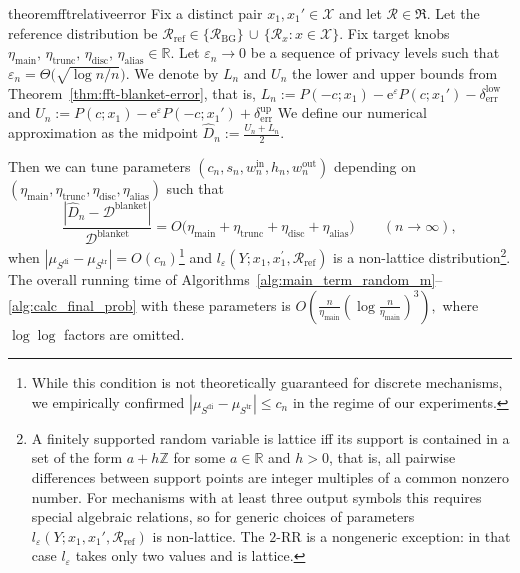\documentclass{article}
\theoremstyle{plain}
\theoremstyle{definition}
\begin{document}
\begin{restatable}{theorem}{fftrelativeerror}
\label{thm:fft-relative-error}
Fix a distinct pair $x_1,x_1' \in \mathcal{X}$ and let $\mathcal R\in\mathfrak{R}$.
Let the reference distribution be
$
  \mathcal R_{\mathrm{ref}}
  \in
  \bigl\{\mathcal R_{\mathrm{BG}}\bigr\}
  \,\cup\,
  \bigl\{\mathcal R_x : x\in\mathcal X\bigr\}.
$
Fix target knobs
$
  \eta_{\mathrm{main}},\,
  \eta_{\mathrm{trunc}},\,
  \eta_{\mathrm{disc}},\,
  \eta_{\mathrm{alias}}
  \in \mathbb{R}.
$
Let $\varepsilon_n\to0$ be a sequence of privacy levels such that
$
  \varepsilon_n= \Theta\bigl(\sqrt{\log n / n}\bigr).
$
We denote by $L_n$ and $U_n$ the lower and upper bounds from
Theorem~\ref{thm:fft-blanket-error}, that is,
$
  L_n
  :=
  P(-c;x_1) - \mathrm e^\varepsilon P(c;x_1')
  - \delta^{\mathrm{low}}_{\mathrm{err}}
$ and
$
  U_n
  :=
  P(c;x_1) - \mathrm e^\varepsilon P(-c;x_1')
  + \delta^{\mathrm{up}}_{\mathrm{err}}
$
We define our numerical approximation as the midpoint
$
  \widehat D_n := \frac{U_n + L_n}{2}.
$

Then we can tune parameters
$
  (c_n,s_n,w_n^{\mathrm{in}},h_n,w_n^{\mathrm{out}})
$
depending on
$(\eta_{\mathrm{main}},\eta_{\mathrm{trunc}},\eta_{\mathrm{disc}},\eta_{\mathrm{alias}})$
such that
\[
  \frac{|\widehat D_n - \mathcal{D}^{\mathrm{blanket}}|}{\mathcal{D}^{\mathrm{blanket}}}
  = O\bigl(
    \eta_{\mathrm{main}}
    + \eta_{\mathrm{trunc}}
    + \eta_{\mathrm{disc}}
    + \eta_{\mathrm{alias}}
  \bigr)
  \qquad (n\to\infty),
\]
when $|\mu_{S^{\mathrm{di}}}-\mu_{S^{\mathrm{tr}}}|=O(c_n)$\footnote{While this condition is not theoretically guaranteed for discrete mechanisms, we empirically confirmed $|\mu_{S^{\mathrm{di}}}-\mu_{S^{\mathrm{tr}}}|\leq c_n$ in the regime of our experiments.} and $l_\varepsilon(Y;x_1,x_1^\prime,\mathcal{R}_{\mathrm{ref}})$ is a non-lattice distribution\footnote{A finitely supported random variable is lattice iff its support is contained in a set of the form $a + h\mathbb{Z}$ for some $a\in\mathbb{R}$ and $h>0$, that is, all pairwise differences between support points are integer multiples of a common nonzero number. For mechanisms with at least three output symbols this requires special algebraic relations, so for generic choices of parameters $l_\varepsilon(Y;x_1,x_1',\mathcal{R}_{\mathrm{ref}})$ is non-lattice. The $2$-RR is a nongeneric exception: in that case $l_\varepsilon$ takes only two values and is lattice.}.
The overall running time of
Algorithms~\ref{alg:main_term_random_m}--\ref{alg:calc_final_prob} with these parameters
is
$
  O\left(\frac{n}{\eta_{\mathrm{main}}}(\log \frac{n}{\eta_{\mathrm{main}}})^3\right),
$
where $\log\log$ factors are omitted.
\end{restatable}
\end{document}
